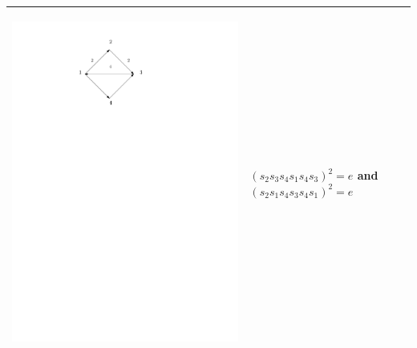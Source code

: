\documentclass[11pt]{amsart}
\theoremstyle{definition}
\begin{document}
\begin{table}
\begin{tabular}{| p{3.5cm} | p{7cm} |}
\begin{center}\includegraphics[scale = .30]{Diagram3.pdf}\end{center} & $(s_{2}s_{3}s_{4}s_{1}s_{4}s_{3})^{2} = e$ and $(s_{2}s_{1}s_{4}s_{3}s_{4}s_{1})^{2} = e$\\ \hline


\end{tabular}
\end{table}
\end{document}

